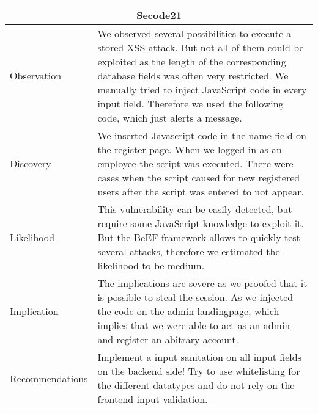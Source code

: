 \documentclass[headsepline,footsepline,footinclude=false,oneside,fontsize=11pt,paper=a4,listof=totoc,bibliography=totoc]{scrbook} %
\begin{document}
\begin{tabular}{ p{3cm}|p{12cm}  }
	\hline
	\multicolumn{2}{c}{\textbf{Secode21}} \\ 
	\hline
	Observation   & We observed several possibilities to execute a stored XSS attack. But not all of
	them could be exploited as the length of the corresponding database fields was
	often very restricted.
	We manually tried to inject JavaScript code in every input field. Therefore we
	used the following code, which just alerts a message.    \\
	
	Discovery  &   We inserted Javascript code in the name field on the register page.
	When we logged in as an employee the script was executed.  There were cases when the script caused for new registered users after the script was entered to not appear.\\
	
	Likelihood & This vulnerability can be easily detected, but require some JavaScript knowledge
	to exploit it.  But the	BeEF framework allows to quickly test several attacks,	therefore we estimated the likelihood to be medium. \\
	
	Implication    &The implications are severe as we proofed that it is possible to steal the session. As we injected the code on the admin landingpage, which implies that we were able to act as an admin and register an abitrary account. \\
	
	Recommendations& Implement a input sanitation on all input fields on the backend side!  Try to
	use whitelisting for the different datatypes and do not rely on the frontend input
	validation.\\ 
	\hline
\end{tabular}
\end{document}
